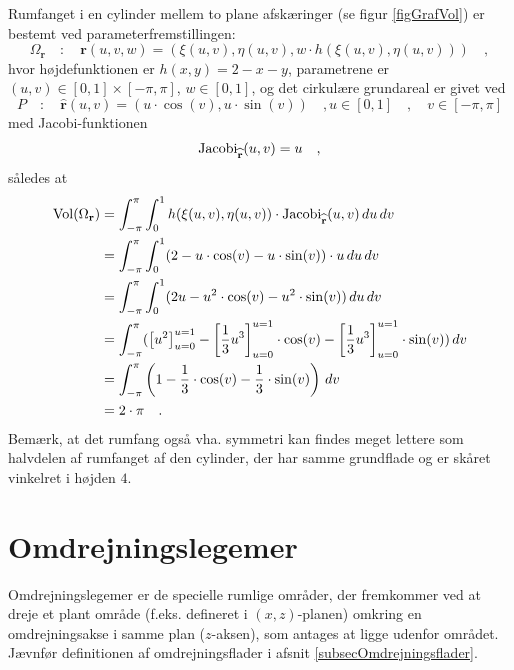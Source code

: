 \begin{example}[Planetariet]\label{exampPlanetarium}
Rumfanget i en cylinder mellem to plane afskæringer (se figur \ref{figGrafVol}) er bestemt ved para\-me\-ter\-frem\-stil\-lin\-gen:
\begin{equation}
\Omega_{\mathbf{r}} \quad : \quad \mathbf{r}(u,v,w) = (\xi(u,v), \eta(u,v), w\cdot h(\xi(u,v),\eta(u,v))) \quad ,
\end{equation}
hvor højdefunktionen er $h(x,y) = 2 - x- y$, parametrene er $(u,v) \in [0,1]\times[-\pi, \pi]$, $w \in [0, 1]$, og det cirkulære grundareal er givet ved
\begin{equation}
P \quad : \quad \widehat{\mathbf{r}}(u,v) = (u\cdot \cos(v), u\cdot \sin(v)) \quad , u \in [0,1] \quad , \quad v \in [-\pi, \pi]
\end{equation}
med Jacobi-funktionen
\begin{equation}
\operatorname{Jacobi}_{\widehat{\mathbf{r}}}(u,v) = u \quad ,
\end{equation}
således at
\begin{equation}
\begin{aligned}
\operatorname{Vol}(\Omega_{\mathbf{r}}) &= \int_{-\pi}^{\pi} \int_{0}^{1} h(\xi(u,v),\eta(u,v))\cdot \operatorname{Jacobi}_{\widehat{\mathbf{r}}}(u,v)  \,du
\, dv \\
&= \int_{-\pi}^{\pi} \int_{0}^{1} (2 - u\cdot \cos(v) -  u\cdot \sin(v))\cdot u \,du \, dv \\
&= \int_{-\pi}^{\pi} \int_{0}^{1} (2u - u^{2}\cdot \cos(v) -  u^{2}\cdot \sin(v)) \,du \, dv \\
&= \int_{-\pi}^{\pi} (\left[u^{2}\right]_{u=0}^{u=1} - \left[\frac{1}{3} u^{3} \right]_{u=0}^{u=1} \cdot \cos(v) -  \left[\frac{1}{3} u^{3} \right]_{u=0}^{u=1}\cdot \sin(v))\, dv \\
&=  \int_{-\pi}^{\pi} \left(1 - \frac{1}{3}\cdot \cos(v) -  \frac{1}{3}\cdot \sin(v)\right)\, dv \\
&= 2\cdot \pi \quad .
\end{aligned}
\end{equation}
Bemærk, at det rumfang også vha. symmetri kan findes meget lettere som halvdelen  af rumfanget af den cylinder, der har samme grundflade og er skåret vinkelret i højden $4$.
\end{example}





\section{Omdrejningslegemer} \label{subsecOmdrejningsLegemer}
{Omdrejningslegemer} er de specielle rumlige
områder, der fremkommer ved at dreje et plant
område (f.eks. defineret i $(x, z)$-planen)
omkring en omdrejningsakse i samme plan
($z$-aksen), som antages at ligge udenfor
området. Jævnfør de\-fi\-ni\-tionen af
om\-drej\-nings\-fla\-der i afsnit
\ref{subsecOmdrejningsflader}. \\

